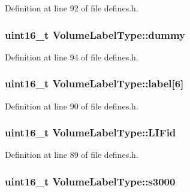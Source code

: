 Definition at line 92 of file defines.\+h.

\subsubsection[{\texorpdfstring{dummy}{dummy}}]{\setlength{\rightskip}{0pt plus 5cm}uint16\+\_\+t Volume\+Label\+Type\+::dummy}\hypertarget{structVolumeLabelType_affbd520c08374524f13708acc05f3f4e}{}\label{structVolumeLabelType_affbd520c08374524f13708acc05f3f4e}


Definition at line 94 of file defines.\+h.

\subsubsection[{\texorpdfstring{label}{label}}]{\setlength{\rightskip}{0pt plus 5cm}uint16\+\_\+t Volume\+Label\+Type\+::label\mbox{[}6\mbox{]}}\hypertarget{structVolumeLabelType_a265fc834b203868cc48482a8be64f60c}{}\label{structVolumeLabelType_a265fc834b203868cc48482a8be64f60c}


Definition at line 90 of file defines.\+h.

\subsubsection[{\texorpdfstring{L\+I\+Fid}{LIFid}}]{\setlength{\rightskip}{0pt plus 5cm}uint16\+\_\+t Volume\+Label\+Type\+::\+L\+I\+Fid}\hypertarget{structVolumeLabelType_a16bdde2d19114ac3238477c29fe75b4a}{}\label{structVolumeLabelType_a16bdde2d19114ac3238477c29fe75b4a}


Definition at line 89 of file defines.\+h.

\subsubsection[{\texorpdfstring{s3000}{s3000}}]{\setlength{\rightskip}{0pt plus 5cm}uint16\+\_\+t Volume\+Label\+Type\+::s3000}\hypertarget{structVolumeLabelType_ac7659e37fbb2bcb0b66c0a0172f9b16c}{}\label{structVolumeLabelType_ac7659e37fbb2bcb0b66c0a0172f9b16c}


